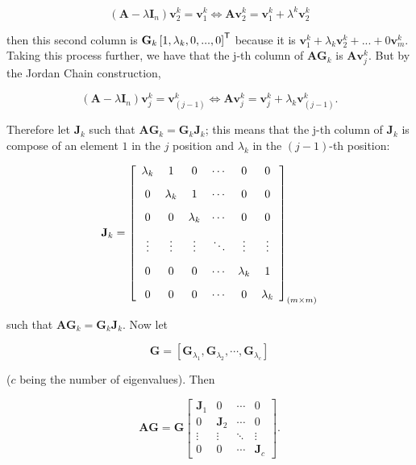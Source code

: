 \begin{equation} \left(\mathbf{A} - \lambda\mathbf{I}_n\right)\mathbf{v}_2^k = \mathbf{v}_1^k \Leftrightarrow \mathbf{A} \mathbf{v}_2^k = \mathbf{v}_1^k + \lambda^k\mathbf{v}_2^k \end{equation}

	\noindent then this second column is $\mathbf{G}_k\left[1,\lambda_k,0,...,0\right]^{\mathsf{T}} $ because it is $\mathbf{v}_1^k + \lambda_k\mathbf{v}_2^k + ... + 0\mathbf{v}_{m}^k$. Taking this process further, we have that the j-th column of $\mathbf{AG}_k$ is $\mathbf{A}\mathbf{v}_j^k$. But by the Jordan Chain construction,

\begin{equation} \left(\mathbf{A} - \lambda\mathbf{I}_n\right)\mathbf{v}_j^k = \mathbf{v}_{(j-1)}^k \Leftrightarrow \mathbf{A} \mathbf{v}_j^k = \mathbf{v}_j^k + \lambda_k\mathbf{v}_{(j-1)}^k .\end{equation}

	Therefore let $\mathbf{J}_k$ such that $\mathbf{AG}_k = \mathbf{G}_k\mathbf{J}_k$; this means that the j-th column of $\mathbf{J}_k$ is compose of an element $1$ in the $j$ position and $\lambda_k$ in the $(j-1)$-th position:

\begin{equation}
	\mathbf{J}_k = \left[\raisebox{15mm}{} \begin{array}{cccccc} \lambda_k & 1 & 0 & \cdots & 0 & 0 \\[3mm] 0 & \lambda_k & 1 & \cdots & 0 & 0 \\[3mm] 0 & 0 &  \lambda_k & \cdots & 0 & 0 \\[3mm] \vdots & \vdots & \vdots & \ddots & \vdots & \vdots \\[3mm] 0 & 0 & 0 & \cdots & \lambda_k & 1 \\[3mm] 0 & 0 & 0 & \cdots & 0 & \lambda_k\end{array}\right]_{(m\times m)}
\end{equation}

	\noindent such that $\mathbf{A}\mathbf{G}_k = \mathbf{G}_k\mathbf{J}_k$. Now let 

\begin{equation} \mathbf{G} = \left[ \mathbf{G}_{\lambda_1},\mathbf{G}_{\lambda_2},\cdots,\mathbf{G}_{\lambda_c}\right]\end{equation}

	\noindent ($c$ being the number of eigenvalues). Then

	\begin{equation} \mathbf{AG} = \mathbf{G}\left[\begin{array}{cccc} \mathbf{J}_1 & 0 & \cdots & 0 \\[3mm] 0 & \mathbf{J}_2 & \cdots & 0 \\[3mm] \vdots & \vdots & \ddots & \vdots \\[3mm] 0 & 0 & \cdots & \mathbf{J}_c \end{array}\right] .\end{equation}

